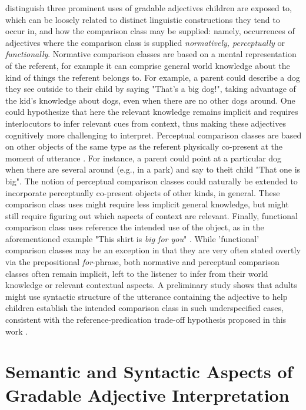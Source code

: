 \textcite{ebeling1994children} distinguish three prominent uses of gradable adjectives children are exposed to, which can be loosely related to distinct linguistic constructions they tend to occur in, and how the comparison class may be supplied: namely, occurrences of adjectives where the comparison class is supplied \textit{normatively, perceptually} or \textit{functionally}. 
Normative comparison classes are based on a mental representation of the referent, for example it can comprise general world knowledge about the kind of things the referent belongs to. For example, a parent could describe a dog they see outside to their child by saying "That's a big dog!", taking advantage of the kid's knowledge about dogs, even when there are no other dogs around. One could hypothesize that here the relevant knowledge remains implicit and requires interlocutors to infer relevant cues from context, thus making these adjectives cognitively more challenging to interpret. 
Perceptual comparison classes are based on other objects of the same type as the referent physically co-present at the moment of utterance \parencite{ebeling1994children}. For instance, a parent could point at a particular dog when there are several around (e.g., in a park) and say to theit child "That one is big". The notion of perceptual comparison classes could naturally be extended to incorporate perceptually co-present objects of other kinds, in general. These comparison class uses might require less implicit general knowledge, but might still require figuring out which aspects of context are relevant. 
Finally, functional comparison class uses reference the intended use of the object, as in the aforementioned example "This shirt is \emph{big for you}" \parencite{ebeling1994children, sera1987}. 
While 'functional' comparison classes may be an exception in that they are very often stated overtly via the prepositional \textit{for}-phrase, both normative and perceptual comparison classes often remain implicit, left to the listener to infer from their world knowledge or relevant contextual aspects. 
A preliminary study shows that adults might use syntactic structure of the utterance containing the adjective to help children establish the intended comparison class in such underspecified cases, consistent with the reference-predication trade-off hypothesis proposed in this work \parencite[discussed in greater detail in Chapter \ref{chapter06}]{sinelnikova2020}. 

\section{Semantic and Syntactic Aspects of Gradable Adjective Interpretation}
\label{2.3.}

